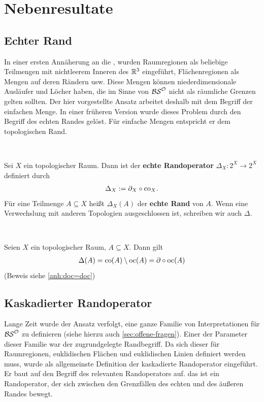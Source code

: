 \chapter{Nebenresultate}\label{chap:nebenresultat}

\section{Echter Rand}
    In einer ersten Annäherung an die \strukt, wurden Raumregionen als beliebige Teilmengen mit nichtleerem Inneren des $\mathbb{R}^3$ eingeführt, Flächenregionen als Mengen auf deren Rändern usw.
    Diese Mengen können niederdimensionale Ausläufer und Löcher haben, die im Sinne von $\mathcal{BS}^{\mathcal{O}}$ nicht als räumliche Grenzen gelten sollten. 
    Der hier vorgestellte Ansatz arbeitet deshalb mit dem Begriff der einfachen Menge. 
    In einer früheren Version wurde dieses Problem durch den Begriff des echten Randes gelöst.
    Für einfache Mengen entspricht er dem topologischen Rand.

    \begin{dfn}\label{def:echtR} \ \vspace{8pt}

        \noindent
        Sei $X$ ein topologischer Raum. Dann ist der \textbf{echte Randoperator} $\Delta_X : 2^X \to 2^X$ definiert durch
        \begin{align*}
            \Delta_X := \partial_X \circ \text{co}_X.
        \end{align*}
        Für eine Teilmenge $A \subseteq X$ heißt $\Delta_X(A)$ der \textbf{echte Rand} von $A$. Wenn eine Verwechslung mit anderen Topologien ausgeschlossen ist, schreiben wir auch $\Delta$.
        
    \end{dfn}

    \begin{satz} \label{satz:dco=doc} \ \vspace{8pt}

        \noindent
        Seien $X$ ein topologischer Raum, $A \subseteq X$. Dann gilt
        \begin{align*}
            \Delta(A) = \text{co}(A) \setminus \text{oc}(A) = \partial \circ \text{oc}(A)
        \end{align*}
        (Beweis siehe \ref{anh:doc=doc})
    \end{satz}
    
    
\section{Kaskadierter Randoperator}\label{sec:kaskadierter-ro}
    Lange Zeit wurde der Ansatz verfolgt, eine ganze Familie von Interpretationen für $\mathcal{BS}^{\mathcal{O}}$ zu definieren (siehe hierzu auch \ref{sec:offene-fragen}).
    Einer der Parameter dieser Familie war der zugrundgelegte Randbegriff.
    Da sich dieser für Raumregionen, euklidischen Flächen und euklidischen Linien definiert werden muss, wurde als allgemeinste Definition der kaskadierte Randoperator eingeführt.
    Er baut auf den Begriff des relevanten Randoperators auf.
    das ist ein Randoperator, der sich zwischen den Grenzfällen des echten und des äußeren Randes bewegt.
    
